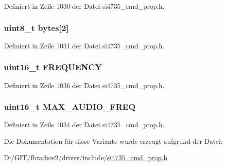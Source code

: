 Definiert in Zeile 1030 der Datei si4735\+\_\+cmd\+\_\+prop.\+h.

\hypertarget{unionfm__hicut__cutoff__freq_a46e4c05d20a047ec169f60d3167e912e}{}
\subsubsection[{bytes}]{\setlength{\rightskip}{0pt plus 5cm}uint8\+\_\+t bytes\mbox{[}2\mbox{]}}\label{unionfm__hicut__cutoff__freq_a46e4c05d20a047ec169f60d3167e912e}


Definiert in Zeile 1031 der Datei si4735\+\_\+cmd\+\_\+prop.\+h.

\hypertarget{unionfm__hicut__cutoff__freq_ae5c18357d97abed93b49dc2a61421ace}{}
\subsubsection[{F\+R\+E\+Q\+U\+E\+N\+C\+Y}]{\setlength{\rightskip}{0pt plus 5cm}uint16\+\_\+t F\+R\+E\+Q\+U\+E\+N\+C\+Y}\label{unionfm__hicut__cutoff__freq_ae5c18357d97abed93b49dc2a61421ace}


Definiert in Zeile 1036 der Datei si4735\+\_\+cmd\+\_\+prop.\+h.

\hypertarget{unionfm__hicut__cutoff__freq_aada3ed206e51efd8ab2ef338686c3a33}{}
\subsubsection[{M\+A\+X\+\_\+\+A\+U\+D\+I\+O\+\_\+\+F\+R\+E\+Q}]{\setlength{\rightskip}{0pt plus 5cm}uint16\+\_\+t M\+A\+X\+\_\+\+A\+U\+D\+I\+O\+\_\+\+F\+R\+E\+Q}\label{unionfm__hicut__cutoff__freq_aada3ed206e51efd8ab2ef338686c3a33}


Definiert in Zeile 1034 der Datei si4735\+\_\+cmd\+\_\+prop.\+h.



Die Dokumentation für diese Variante wurde erzeugt aufgrund der Datei\+:\begin{DoxyCompactItemize}
\item 
D\+:/\+G\+I\+T/fhradiov2/driver/include/\hyperlink{si4735__cmd__prop_8h}{si4735\+\_\+cmd\+\_\+prop.\+h}\end{DoxyCompactItemize}
